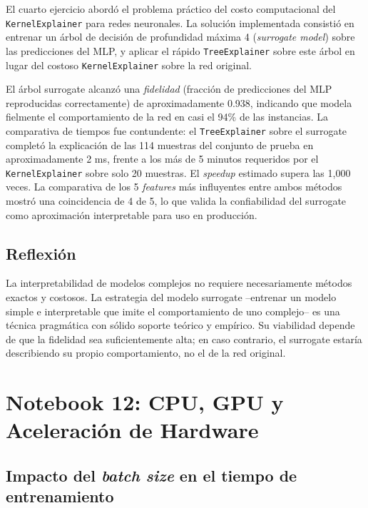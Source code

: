 \documentclass[12pt, a4paper]{article}
\begin{document}
El cuarto ejercicio abordó el problema práctico del costo computacional del \texttt{KernelExplainer} para redes neuronales. La solución implementada consistió en entrenar un árbol de decisión de profundidad máxima 4 (\textit{surrogate model}) sobre las predicciones del MLP, y aplicar el rápido \texttt{TreeExplainer} sobre este árbol en lugar del costoso \texttt{KernelExplainer} sobre la red original.

El árbol surrogate alcanzó una \textit{fidelidad} (fracción de predicciones del MLP reproducidas correctamente) de aproximadamente 0.938, indicando que modela fielmente el comportamiento de la red en casi el 94\% de las instancias. La comparativa de tiempos fue contundente: el \texttt{TreeExplainer} sobre el surrogate completó la explicación de las 114 muestras del conjunto de prueba en aproximadamente 2 ms, frente a los más de 5 minutos requeridos por el \texttt{KernelExplainer} sobre solo 20 muestras. El \textit{speedup} estimado supera las 1,000 veces. La comparativa de los 5 \textit{features} más influyentes entre ambos métodos mostró una coincidencia de 4 de 5, lo que valida la confiabilidad del surrogate como aproximación interpretable para uso en producción.

\subsection{Reflexión}

La interpretabilidad de modelos complejos no requiere necesariamente métodos exactos y costosos. La estrategia del modelo surrogate --entrenar un modelo simple e interpretable que imite el comportamiento de uno complejo-- es una técnica pragmática con sólido soporte teórico y empírico. Su viabilidad depende de que la fidelidad sea suficientemente alta; en caso contrario, el surrogate estaría describiendo su propio comportamiento, no el de la red original.

\section{Notebook 12: CPU, GPU y Aceleración de Hardware}

\subsection{Impacto del \textit{batch size} en el tiempo de entrenamiento}
\end{document}

